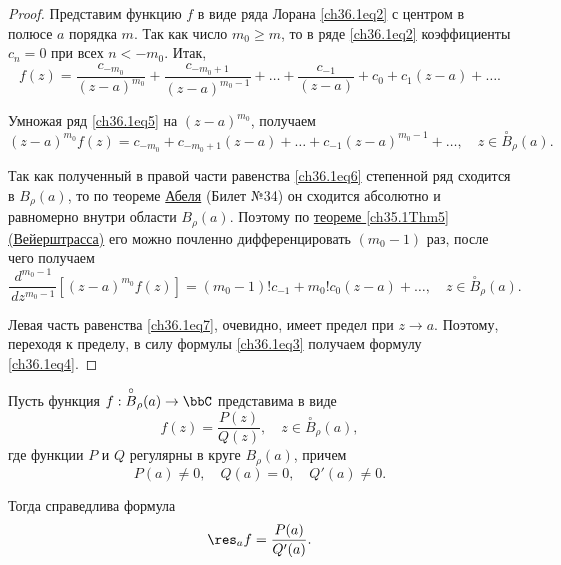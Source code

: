 \begin{leftbar}
\begin{proof}
Представим функцию $f$ в виде ряда Лорана \eqref{ch36.1eq2} с центром в полюсе $a$ порядка $m$. Так как число $m_0 \ge m$, то в ряде \eqref{ch36.1eq2} коэффициенты $c_n = 0$ при всех $n < -m_0$. Итак,
\begin{equation} \label{ch36.1eq5}
f(z) = \frac{c_{-m_0}}{(z - a)^{m_0}} + \frac{c_{-m_0 + 1}}{(z - a)^{m_0 - 1}} + \ldots + \frac{c_{-1}}{(z - a)} + c_0 + c_1 (z - a) + \ldots.
\end{equation}

Умножая ряд \eqref{ch36.1eq5} на $(z - a)^{m_0}$, получаем 
\begin{equation} \label{ch36.1eq6}
(z - a)^{m_0} f(z) = c_{-m_0} + c_{-m_0 + 1} (z - a) + \ldots + c_{-1} (z - a)^{m_0 - 1} + \ldots, \quad z \in \overset{\circ}{B}_\rho(a).
\end{equation}

Так как полученный в правой части равенства \eqref{ch36.1eq6} степенной ряд сходится в $B_\rho(a)$, то по теореме \hyperref[ch34.2Thm1]{Абеля} (Билет №34) он сходится абсолютно и равномерно внутри области $B_\rho(a)$. Поэтому по \hyperref[ch35.1Thm5]{теореме \ref{ch35.1Thm5} (Вейерштрасса)} его можно почленно дифференцировать $(m_0 - 1)$ раз, после чего получаем
\begin{equation} \label{ch36.1eq7}
\frac{\,d^{m_0 - 1}}{\,dz^{m_0 - 1}} [(z - a)^{m_0} f(z)] = (m_0 - 1)! c_{-1} + m_0! c_0 (z - a) + \ldots, \quad z \in \overset{\circ}{B}_\rho(a).
\end{equation}

Левая часть равенства \eqref{ch36.1eq7}, очевидно, имеет предел при $z \to a$. Поэтому, переходя к пределу, в силу формулы \eqref{ch36.1eq3} получаем формулу \eqref{ch36.1eq4}.
\end{proof}
\end{leftbar}

\begin{lemm}
Пусть функция $f : \overset{\circ}{B}_\rho(a) \to \bbC$ представима в виде
$$
f(z) = \frac{P(z)}{Q(z)}, \quad z \in \overset{\circ}{B}_\rho(a),
$$
где функции $P$ и $Q$ регулярны в круге $B_\rho(a)$, причем
\begin{equation} \label{ch36.1eq8}
P(a) \not= 0, \quad Q(a) = 0, \quad Q'(a) \not= 0.
\end{equation}

Тогда справедлива формула
\begin{equation} \label{ch36.1eq9}
\res_{a} f = \frac{P(a)}{Q'(a)}.
\end{equation}

\end{lemm}

